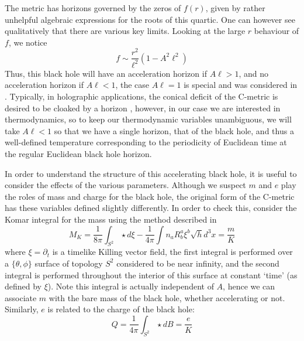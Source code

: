 \documentclass[
twoside,openright,frontopenright]{dmathesis}
\begin{document}
The metric has horizons governed by the zeros of $f(r)$,
given by rather unhelpful algebraic expressions for the roots of this
quartic. One can however see qualitatively that there are various
key limits. Looking at the large $r$ behaviour of $f$, we notice
\begin{equation}
f \sim \frac{r^2}{\ell^2} (1- A^2 \ell^2)
\end{equation}
Thus, this black hole will have an acceleration horizon if $A\ell>1$,
and no acceleration horizon if $A\ell<1$, the case $A\ell=1$ is special and
was considered in \cite{Emparan:1999wa}. 
Typically, in holographic applications, the conical deficit of the C-metric
is desired to be cloaked by a horizon \cite{Hubeny:2009kz},
however, in our case we are interested in thermodynamics, so to
keep our thermodynamic variables unambiguous, we will take 
$A\ell<1$ so that we have a single horizon, that of the black hole,
and thus a well-defined temperature corresponding to the periodicity
of Euclidean time at the regular Euclidean black hole horizon.

In order to understand the structure of this accelerating black hole, 
it is useful to consider the effects of the various parameters. 
Although we suspect $m$ and $e$ play the roles of mass and charge
for the black hole, the original form of the C-metric has these variables
defined slightly differently. In order to check this, consider the Komar 
integral for the mass using the
method described in \cite{Magnon:1985sc}
\begin{equation}
M_K = \frac{1}{8\pi} \int_{S^2} \star d\xi - \frac{1}{4\pi}
\int n_a R^a_b \xi^b \sqrt{h} d^3x = \frac{m}{K}
\label{komar}
\end{equation}
where $\xi = \partial_t$ is a timelike Killing vector field, the first integral
is performed over a $\{\theta,\phi\}$ surface of topology $S^2$ considered to be
near infinity, and the second integral is performed throughout the interior of
this surface at constant `time' (as defined by $\xi$).  Note this integral is
actually independent of $A$, hence we can associate $m$ with the bare mass of
the black hole, whether accelerating or not.  Similarly, $e$ is related to the
charge of the black hole:
\begin{equation}
Q = \frac{1}{4\pi} \int_{S^2} \star dB = \frac{e}{K}
\label{Qdef}
\end{equation}
\end{document}

